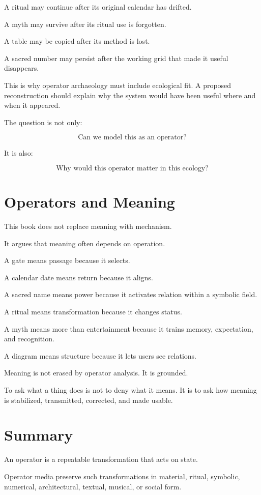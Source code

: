 \documentclass[11pt]{book}
\begin{document}
A ritual may continue after its original calendar has drifted.

A myth may survive after its ritual use is forgotten.

A table may be copied after its method is lost.

A sacred number may persist after the working grid that made it useful disappears.

This is why operator archaeology must include ecological fit. A proposed reconstruction should explain why the system would have been useful where and when it appeared.

The question is not only:

\[
\text{Can we model this as an operator?}
\]

It is also:

\[
\text{Why would this operator matter in this ecology?}
\]

\section{Operators and Meaning}

This book does not replace meaning with mechanism.

It argues that meaning often depends on operation.

A gate means passage because it selects.

A calendar date means return because it aligns.

A sacred name means power because it activates relation within a symbolic field.

A ritual means transformation because it changes status.

A myth means more than entertainment because it trains memory, expectation, and recognition.

A diagram means structure because it lets users see relations.

Meaning is not erased by operator analysis. It is grounded.

To ask what a thing does is not to deny what it means. It is to ask how meaning is stabilized, transmitted, corrected, and made usable.

\section{Summary}

An operator is a repeatable transformation that acts on state.

Operator media preserve such transformations in material, ritual, symbolic, numerical, architectural, textual, musical, or social form.
\end{document}

